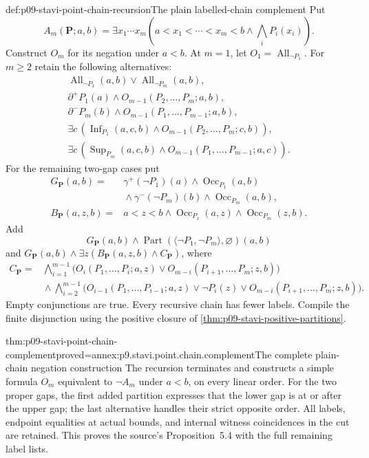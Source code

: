 \begin{hbdefinition}{def:p09-stavi-point-chain-recursion}{The plain labelled-chain complement}
Put
\[
 A_m(\mathbf P;a,b)=
       \exists x_1\cdots x_m
          (a<x_1<\cdots<x_m<b\land\bigwedge_iP_i(x_i)).
\]
Construct \(O_m\) for its negation under \(a<b\).
At \(m=1\), let \(O_1=\operatorname{All}_{\neg P_1}\).
For \(m\geq2\) retain the following alternatives:
\[
\begin{gathered}
 \operatorname{All}_{\neg P_1}(a,b)\lor
                  \operatorname{All}_{\neg P_m}(a,b),\\
 \partial^+P_1(a)\land O_{m-1}(P_2,\ldots,P_m;a,b),\\
 \partial^-P_m(b)\land O_{m-1}(P_1,\ldots,P_{m-1};a,b),\\
 \exists c\,(\operatorname{Inf}_{P_1}(a,c,b)\land
                              O_{m-1}(P_2,\ldots,P_m;c,b)),\\
 \exists c\,(\operatorname{Sup}_{P_m}(a,c,b)\land
                              O_{m-1}(P_1,\ldots,P_{m-1};a,c)).
\end{gathered}
\]
For the remaining two-gap cases put
\[
\begin{split}
 G_{\mathbf P}(a,b)={}&
 \gamma^+(\neg P_1)(a)\land\operatorname{Occ}_{P_1}(a,b)\\
 &{}\land\gamma^-(\neg P_m)(b)\land\operatorname{Occ}_{P_m}(a,b),\\
 B_{\mathbf P}(a,z,b)={}&
     a<z<b\land\operatorname{Occ}_{P_1}(a,z)
                         \land\operatorname{Occ}_{P_m}(z,b).
\end{split}
\]
Add
\[
 G_{\mathbf P}(a,b)\land
        \operatorname{Part}(\langle\neg P_1,\neg P_m\rangle,\varnothing)(a,b)
\]
and \(G_{\mathbf P}(a,b)\land\exists z(B_{\mathbf P}(a,z,b)\land C_{\mathbf P})\),
where
\[
\begin{split}
 C_{\mathbf P}={}&
 \bigwedge_{i=1}^{m-1}
   \bigl(O_i(P_1,\ldots,P_i;a,z)\lor
                O_{m-i}(P_{i+1},\ldots,P_m;z,b)\bigr)\\
 &{}\land\bigwedge_{i=2}^{m-1}
   \bigl(O_{i-1}(P_1,\ldots,P_{i-1};a,z)
          \lor\neg P_i(z)
          \lor O_{m-i}(P_{i+1},\ldots,P_m;z,b)\bigr).
\end{split}
\]
Empty conjunctions are true. Every recursive chain
has fewer labels. Compile the finite disjunction
using the positive closure of
\cref{thm:p09-stavi-positive-partitions}.
\end{hbdefinition}

\begin{hbtheorem}{thm:p09-stavi-point-chain-complement}{proved=annex:p9.stavi.point.chain.complement}{The complete plain-chain negation construction}
The recursion terminates and constructs a simple
formula \(O_m\) equivalent to \(\neg A_m\)
under \(a<b\), on every linear order.
For the two proper gaps, the first added
partition expresses that the lower gap is
at or after the upper gap; the last
alternative handles their strict opposite
order. All labels, endpoint equalities
at actual bounds, and internal witness
coincidences in the cut are retained.
This proves the source's Proposition~5.4
with the full remaining label lists.
\end{hbtheorem}

